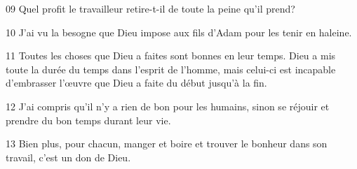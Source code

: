 
09 Quel profit le travailleur retire-t-il de toute la peine qu’il prend?

10 J’ai vu la besogne que Dieu impose aux fils d’Adam pour les tenir en haleine.

11 Toutes les choses que Dieu a faites sont bonnes en leur temps. Dieu a mis toute la durée du temps dans l’esprit de l’homme, mais celui-ci est incapable d’embrasser l’œuvre que Dieu a faite du début jusqu’à la fin.

12 J’ai compris qu’il n’y a rien de bon pour les humains, sinon se réjouir et prendre du bon temps durant leur vie.

13 Bien plus, pour chacun, manger et boire et trouver le bonheur dans son travail, c’est un don de Dieu.
